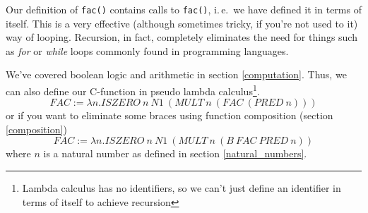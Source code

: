 \documentclass[11pt]{article}
\begin{document}
Our definition of \texttt{fac()} contains calls to \texttt{fac()}, i.\,e.\ we
have defined it in terms of itself. This is a very effective (although
sometimes tricky, if you're not used to it) way of looping. Recursion, in fact,
completely eliminates the need for things such as \emph{for} or \emph{while}
loops commonly found in programming languages.

We've covered boolean logic and arithmetic in section \ref{computation}. Thus,
we can also define our C-function in pseudo lambda calculus\footnote{Lambda
calculus has no identifiers, so we can't just define an identifier in terms of
itself to achieve recursion}.
\[FAC:=\lambda n.ISZERO\ n\ N1\ (MULT\ n\ (FAC\ (PRED\ n)))\]
or if you want to eliminate some braces using function composition (section
\ref{composition})
\[FAC:=\lambda n.ISZERO\ n\ N1\ (MULT\ n\ (B\ FAC\ PRED\ n))\]
where \(n\) is a natural number as defined in section \ref{natural_numbers}.
\end{document}
